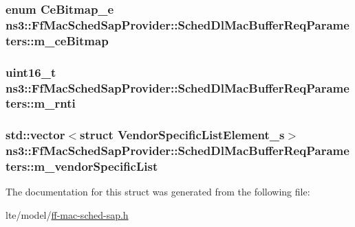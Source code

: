 \subsubsection[{\texorpdfstring{m\+\_\+ce\+Bitmap}{m_ceBitmap}}]{\setlength{\rightskip}{0pt plus 5cm}enum {\bf Ce\+Bitmap\+\_\+e} ns3\+::\+Ff\+Mac\+Sched\+Sap\+Provider\+::\+Sched\+Dl\+Mac\+Buffer\+Req\+Parameters\+::m\+\_\+ce\+Bitmap}\hypertarget{structns3_1_1FfMacSchedSapProvider_1_1SchedDlMacBufferReqParameters_aaa2420dc6c15845d9e2c527d9cffc368}{}\label{structns3_1_1FfMacSchedSapProvider_1_1SchedDlMacBufferReqParameters_aaa2420dc6c15845d9e2c527d9cffc368}
\subsubsection[{\texorpdfstring{m\+\_\+rnti}{m_rnti}}]{\setlength{\rightskip}{0pt plus 5cm}uint16\+\_\+t ns3\+::\+Ff\+Mac\+Sched\+Sap\+Provider\+::\+Sched\+Dl\+Mac\+Buffer\+Req\+Parameters\+::m\+\_\+rnti}\hypertarget{structns3_1_1FfMacSchedSapProvider_1_1SchedDlMacBufferReqParameters_a9eb6c81c13e0cdb4b78714dbae16fd56}{}\label{structns3_1_1FfMacSchedSapProvider_1_1SchedDlMacBufferReqParameters_a9eb6c81c13e0cdb4b78714dbae16fd56}
\subsubsection[{\texorpdfstring{m\+\_\+vendor\+Specific\+List}{m_vendorSpecificList}}]{\setlength{\rightskip}{0pt plus 5cm}std\+::vector$<$struct {\bf Vendor\+Specific\+List\+Element\+\_\+s}$>$ ns3\+::\+Ff\+Mac\+Sched\+Sap\+Provider\+::\+Sched\+Dl\+Mac\+Buffer\+Req\+Parameters\+::m\+\_\+vendor\+Specific\+List}\hypertarget{structns3_1_1FfMacSchedSapProvider_1_1SchedDlMacBufferReqParameters_afc1d171431a5b30716fb9de37cfbb10d}{}\label{structns3_1_1FfMacSchedSapProvider_1_1SchedDlMacBufferReqParameters_afc1d171431a5b30716fb9de37cfbb10d}


The documentation for this struct was generated from the following file\+:\begin{DoxyCompactItemize}
\item 
lte/model/\hyperlink{ff-mac-sched-sap_8h}{ff-\/mac-\/sched-\/sap.\+h}\end{DoxyCompactItemize}
